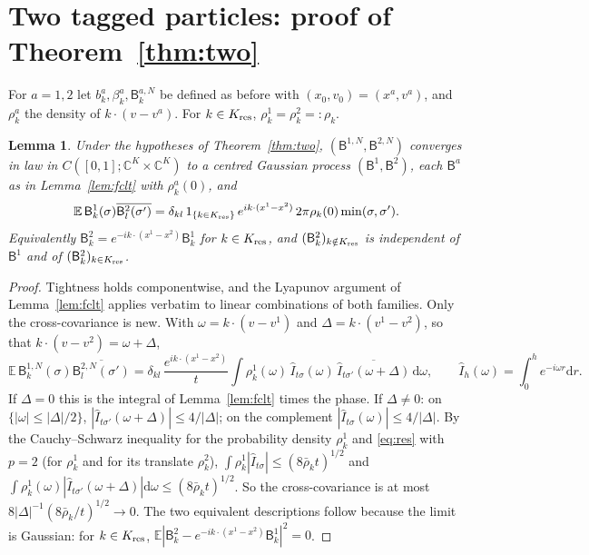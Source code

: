 \documentclass[11pt]{article}
\newcommand{\dd}{\mathrm{d}}
\newcommand{\E}{\mathbb{E}}
\newcommand{\C}{\mathbb{C}}
\newcommand{\sB}{\mathsf{B}}
\newcommand{\bbar}{\bar\rho}
\newtheorem{lemma}[theorem]{Lemma}
\theoremstyle{remark}
\begin{document}
\section{Two tagged particles: proof of Theorem~\ref{thm:two}}

For $a=1,2$ let $b^a_k,\beta^a_k,\sB^{a,N}_k$ be defined as before with
$(x_0,v_0)=(x^a,v^a)$, and $\rho^a_k$ the density of $k\cdot(v-v^a)$. For
$k\in K_{\rm res}$, $\rho^1_k=\rho^2_k=:\rho_k$.

\begin{lemma}\label{lem:fclt2}
Under the hypotheses of Theorem~\ref{thm:two}, $(\sB^{1,N},\sB^{2,N})$
converges in law in $C([0,1];\C^K\times\C^K)$ to a centred Gaussian process
$(\sB^1,\sB^2)$, each $\sB^a$ as in Lemma~\ref{lem:fclt} with
$\rho^a_k(0)$, and
\[
  \E\,\sB^1_k(\sigma)\overline{\sB^2_l(\sigma')}
  =\delta_{kl}\,1_{\{k\in K_{\rm res}\}}\,e^{ik\cdot(x^1-x^2)}\,
   2\pi\rho_k(0)\min(\sigma,\sigma').
\]
Equivalently $\sB^2_k=e^{-ik\cdot(x^1-x^2)}\sB^1_k$ for $k\in K_{\rm res}$,
and $(\sB^2_k)_{k\notin K_{\rm res}}$ is independent of $\sB^1$ and of
$(\sB^2_k)_{k\in K_{\rm res}}$.
\end{lemma}

\begin{proof}
Tightness holds componentwise, and the Lyapunov argument of
Lemma~\ref{lem:fclt} applies verbatim to linear combinations of both
families. Only the cross-covariance is new. With $\omega=k\cdot(v-v^1)$ and
$\Delta=k\cdot(v^1-v^2)$, so that $k\cdot(v-v^2)=\omega+\Delta$,
\[
  \E\,\sB^{1,N}_k(\sigma)\overline{\sB^{2,N}_l(\sigma')}
  =\delta_{kl}\,\frac{e^{ik\cdot(x^1-x^2)}}{t}
  \int\rho^1_k(\omega)\,\hat I_{t\sigma}(\omega)\,
  \overline{\hat I_{t\sigma'}(\omega+\Delta)}\,\dd\omega,
  \qquad\hat I_h(\omega)=\int_0^he^{-i\omega r}\dd r .
\]
If $\Delta=0$ this is the integral of Lemma~\ref{lem:fclt} times the phase.
If $\Delta\ne0$: on $\{|\omega|\le|\Delta|/2\}$,
$|\hat I_{t\sigma'}(\omega+\Delta)|\le4/|\Delta|$; on the complement
$|\hat I_{t\sigma}(\omega)|\le4/|\Delta|$. By the Cauchy--Schwarz inequality
for the probability density $\rho^1_k$ and \eqref{eq:res} with $p=2$ (for
$\rho^1_k$ and for its translate $\rho^2_k$),
$\int\rho^1_k|\hat I_{t\sigma}|\le(8\bbar_kt)^{1/2}$ and
$\int\rho^1_k(\omega)|\hat I_{t\sigma'}(\omega+\Delta)|\dd\omega
\le(8\bbar_kt)^{1/2}$. So the cross-covariance is at most
$8|\Delta|^{-1}(8\bbar_k/t)^{1/2}\to0$. The two equivalent descriptions
follow because the limit is Gaussian: for $k\in K_{\rm res}$,
$\E|\sB^2_k-e^{-ik\cdot(x^1-x^2)}\sB^1_k|^2=0$.
\end{proof}
\end{document}
